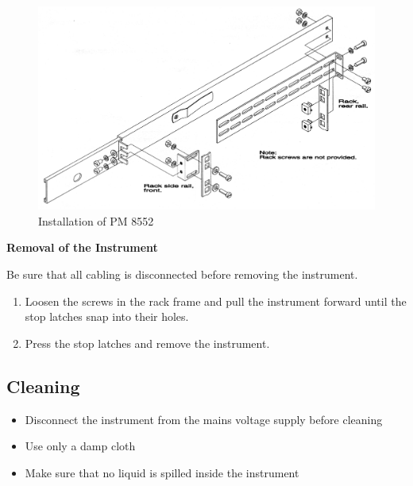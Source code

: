 \begin{figure}[hbt]
\centering
\includegraphics[width=\textwidth]{fig/rack}
\caption{Installation of PM 8552}
\end{figure}

\textbf{Removal of the Instrument}

Be sure that all cabling is disconnected before removing the instrument.
\begin{enumerate}
\item Loosen the screws in the rack frame and pull the instrument forward until the stop latches snap into their holes.
\item Press the stop latches and remove the instrument.
\end{enumerate}

\subsection{Cleaning}
\begin{itemize}
\item Disconnect the instrument from the mains voltage supply before cleaning
\item Use only a damp cloth
\item Make sure that no liquid is spilled inside the instrument
\end{itemize}
%
%
%

